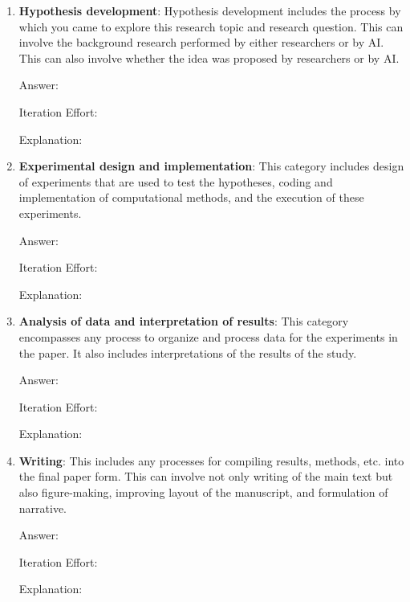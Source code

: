 \documentclass{article}
\begin{document}
\begin{enumerate}

    \item \textbf{Hypothesis development}: Hypothesis development includes the process by which you came to explore this research topic and research question. This can involve the background research performed by either researchers or by AI. This can also involve whether the idea was proposed by researchers or by AI. 

    Answer: \involvementTODO{} %

    Iteration Effort: \iterationTODO{} %
    
    Explanation: \justificationTODO{}
    
    \item \textbf{Experimental design and implementation}: This category includes design of experiments that are used to test the hypotheses, coding and implementation of computational methods, and the execution of these experiments. 

    Answer: \involvementTODO{} %

    Iteration Effort: \iterationTODO{} %
    
    Explanation: \justificationTODO{}
    
    \item \textbf{Analysis of data and interpretation of results}: This category encompasses any process to organize and process data for the experiments in the paper. It also includes interpretations of the results of the study.

    Answer: \involvementTODO{} %

    Iteration Effort: \iterationTODO{} %
    
    Explanation: \justificationTODO{}
    
    \item \textbf{Writing}: This includes any processes for compiling results, methods, etc. into the final paper form. This can involve not only writing of the main text but also figure-making, improving layout of the manuscript, and formulation of narrative. 

    Answer: \involvementTODO{} %

    Iteration Effort: \iterationTODO{} %
    
    Explanation: \justificationTODO{}

\end{enumerate}
\end{document}
